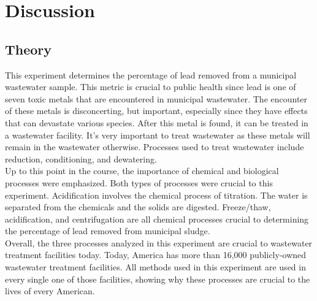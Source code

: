 \documentclass{article}
\begin{document}
    \section{Discussion}
    \subsection{Theory}
    \indent This experiment determines the percentage of lead removed from a municipal wastewater sample. This metric is crucial to public health since lead is one of seven toxic metals that are encountered in municipal wastewater. The encounter of these metals is disconcerting, but important, especially since they have effects that can devastate various species. After this metal is found, it can be treated in a wastewater facility. It's very important to treat wastewater as these metals will remain in the wastewater otherwise. Processes used to treat wastewater include reduction, conditioning, and dewatering.\\
    \indent Up to this point in the course, the importance of chemical and biological processes were emphasized. Both types of processes were crucial to this experiment. Acidification involves the chemical process of titration. The water is separated from the chemicals and the solids are digested. Freeze/thaw, acidification, and centrifugation are all chemical processes crucial to determining the percentage of lead removed from municipal sludge.\\
    \indent Overall, the three processes analyzed in this experiment are crucial to wastewater treatment facilities today. Today, America has more than 16,000 publicly-owned wastewater treatment facilities. All methods used in this experiment are used in every single one of those facilities, showing why these processes are crucial to the lives of every American.
\end{document}
